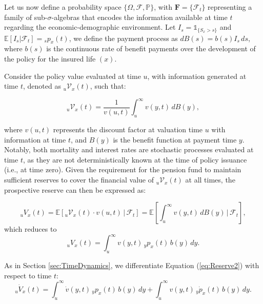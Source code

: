 \documentclass[12pt]{article}
\begin{document}
{Let us now define a probability space \( \{\Omega, \mathcal{F}, \mathbb{P}\} \), with \(\textbf{F} = \{\mathcal{F}_t\}\) representing a family of sub-\(\sigma\)-algebras that encodes the information available at time \( t \) regarding the economic-demographic environment. Let \( I_{s} = \mathds{1}_{\{S_x > s\}} \) and \( \mathbb{E}[I_{s} | \mathcal{F}_t] = {}_s p_x(t) \), we define the payment process as \( dB(s) = b(s) I_{s} \, ds \), where \( b(s) \) is the continuous rate of benefit payments over the development of the policy for the insured life \( (x) \).


Consider the policy value evaluated at time \( u \), with information generated at time \( t \), denoted as \({}_u\mathcal{V}_x(t)\), such that:

\[
{}_u\mathcal{V}_x(t) = \frac{1}{v(u, t)} \int_u^{\infty} v(y, t) \, dB(y),
\]

where \( v(u, t) \) represents the discount factor at valuation time \( u \) with information at time \( t \), and \( B(y) \) is the benefit function at payment time \( y \). Notably, both mortality and interest rates are stochastic processes evaluated at time \( t \), as they are not deterministically known at the time of policy issuance (i.e., at time zero). Given the requirement for the pension fund to maintain sufficient reserves to cover the financial value of \({}_u\mathcal{V}_x(t)\) at all times, the prospective reserve can then be expressed as:

\begin{equation}\label{eq:Reserve1}
	{}_uV_x(t) = \mathbb{E}[{}_u\mathcal{V}_x(t) \cdot v(u,t) \,|\, \mathcal{F}_t] = \mathbb{E} \left[ \int_u^\infty v(y,t) \, dB(y) \,|\, \mathcal{F}_t \right],
\end{equation}
which reduces to
\begin{equation}\label{eq:Reserve2}
	{}_uV_x(t) = \int_u^\infty v(y,t) \, {}_yp_x(t) \, b(y) \, dy.
\end{equation}

As in Section \ref{sec:TimeDynamics}, we differentiate Equation (\ref{eq:Reserve2}) with respect to time $t$:
\begin{equation}\label{eq:DifferentiateReserveT}
	{}_u\dot{V}_x(t) = \int_u^\infty \dot{v}(y,t) \, {}_yp_x(t) \, b(y) \, dy + \int_u^\infty v(y,t) \, {}_y\dot{p}_x(t) \, b(y) \, dy.
\end{equation}

}
\end{document}
